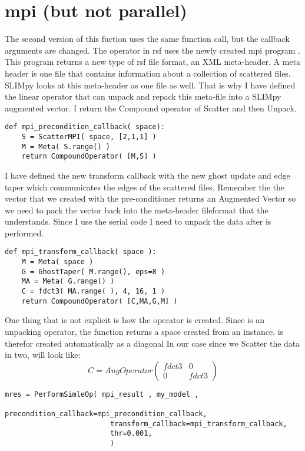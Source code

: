 \documentclass{manual}
\begin{document}
        \section{mpi (but not parallel)}
        The second version of this fuction uses the same   function call, but the callback arguments are changed.
        The  operator  in rsf uses the newly created mpi program . 
        This program returns a new type of rsf file format, an XML meta-header. A meta header is one file that contains 
        information about a collection of scattered files. SLIMpy looks at this meta-header as one file as well. 
        That is why I have defined the  linear operator  that can unpack and repack this meta-file
         into a SLIMpy augmented vector. I return the Compound operator of Scatter and then Unpack. 
\begin{verbatim}
def mpi_precondition_callback( space):
    S = ScatterMPI( space, [2,1,1] )
    M = Meta( S.range() )
    return CompoundOperator( [M,S] )
\end{verbatim}
	 I have defined the new transform callback with the new ghost update and edge taper which communicates the edges of the scattered files.
	Remember the the vector that we created with the  pre-conditioner returns an Augmented Vector so we need to pack the
	vector back into the meta-header fileformat that the    understands. 
	Since I use the serial  code I need to unpack the data 
	after  is performed.
\begin{verbatim}
def mpi_transform_callback( space ):
    M = Meta( space )
    G = GhostTaper( M.range(), eps=8 )
    MA = Meta( G.range() )
    C = fdct3( MA.range( ), 4, 16, 1 )
    return CompoundOperator( [C,MA,G,M] )
\end{verbatim}
	One thing that is not explicit is how the   operator  is created. Since  is an unpacking operator, the function
	 returns a space created from an  instance.   is therefor created automatically as a diagonal 
	In our case since we Scatter the data in two,  will look like:
	\[ C = AugOperator	
	\left( \begin{array}{cc}
		fdct3   & 0  \\
		0 &  fdct3
	\end{array} \right) 
	\]
\begin{verbatim}
mres = PerformSimleOp( mpi_result , my_model ,
                         precondition_callback=mpi_precondition_callback,
                         transform_callback=mpi_transform_callback,
                         thr=0.001,
                         )
\end{verbatim}
\end{document}
